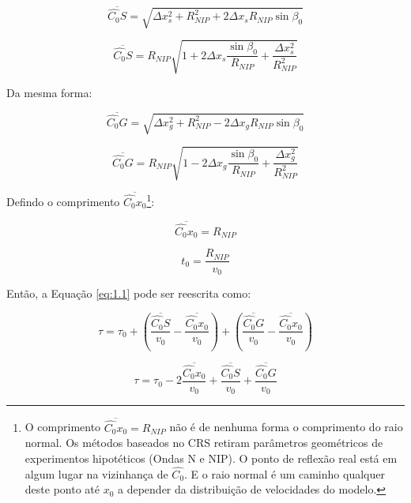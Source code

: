 \documentclass[a4paper, 12pt]{article}
\begin{document}
\begin{equation}
 \label{eq:1.16}
 \overline{\hat{C_0}S} = \sqrt{ \Delta x_{s}^2 + R_{NIP}^2 + 2 \Delta x_s R_{NIP} \sin{\beta_0} }
\end{equation}

\begin{equation}
 \label{eq:1.17}
 \overline{\hat{C_0}S} = 
 R_{NIP} \sqrt{  1 + 2 \Delta x_s \frac{\sin{\beta_0}}{R_{NIP}} + \frac{\Delta x_{s}^2}{R_{NIP}^2} }
\end{equation}

Da mesma forma:

\begin{equation}
 \label{eq:1.18}
 \overline{\hat{C_0}G} = \sqrt{ \Delta x_{g}^2 + R_{NIP}^2 - 2 \Delta x_g R_{NIP} \sin{\beta_0} }
\end{equation}

\begin{equation}
 \label{eq:1.19}
 \overline{\hat{C_0}G} = 
 R_{NIP} \sqrt{  1 - 2 \Delta x_g \frac{\sin{\beta_0}}{R_{NIP}} + \frac{\Delta x_{g}^2}{R_{NIP}^2} }
\end{equation}

Defindo o comprimento $\overline{\hat{C_0}x_0}$\footnote{O comprimento
$\overline{\hat{C_0}x_0} = R_{NIP}$ não é de nenhuma forma o comprimento do raio normal.
Os métodos baseados no CRS
retiram parâmetros geométricos de experimentos hipotéticos (Ondas N e NIP).
O ponto de reflexão real está em algum lugar na vizinhança de $\hat{C_0}$.
E o raio normal é um caminho qualquer deste ponto até $x_0$ a depender da distribuição de velocidades
do modelo.}:

\begin{equation}
 \label{eq:1.20}
 \overline{\hat{C_0}x_0} = R_{NIP}
\end{equation}

\begin{equation}
 \label{eq:1.21}
t_0 = \frac{R_{NIP}}{v_0}
\end{equation}

Então, a Equação \ref{eq:1.1} pode ser reescrita como:

\begin{equation}
 \label{eq:1.22}
\tau = \tau_0 + \left( \frac{\overline{\hat{C_0}S}}{v_0} - \frac{\overline{\hat{C_0}x_0}}{v_0} \right)
+ \left( \frac{\overline{\hat{C_0}G}}{v_0} - \frac{\overline{\hat{C_0}x_0}}{v_0} \right)
\end{equation}

\begin{equation}
 \label{eq:1.23}
\tau = \tau_0 - 2 \frac{\overline{\hat{C_0}x_0}}{v_0} + \frac{\overline{\hat{C_0}S}}{v_0}
+ \frac{\overline{\hat{C_0}G}}{v_0}
\end{equation}
\end{document}
